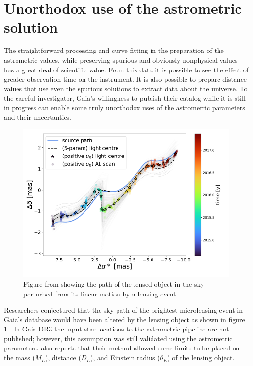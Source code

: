\documentclass[preprint2]{aastex631}
\begin{document}
\section{Unorthodox use of the astrometric solution} \label{sec:unorthodox}

The straightforward processing and curve fitting in the preparation of the astrometric values, while preserving spurious and obviously nonphysical values has a great deal of scientific value. From this data it is possible to see the effect of greater observation time on the instrument. It is also possible to prepare distance values that use even the spurious solutions to extract data about the universe. To the careful investigator, Gaia's willingness to publish their catalog while it is still in progress can enable some truly unorthodox uses of the astrometric parameters and their uncertanties.

\begin{figure}
	\includegraphics[width=\columnwidth]{microlensingpath.png}
	\caption{Figure from \cite{jablonskaThere2022} showing the path of the lensed object in the sky perturbed from its linear motion by a lensing event.}
	\label{fig:starpath}
\end{figure}

Researchers conjectured that the sky path of the brightest microlensing event in Gaia's database would have been altered by the lensing object as shown in figure \ref{fig:starpath} \citep{jablonskaThere2022} . In Gaia DR3 the input star locations to the astrometric pipeline are not published; however, this assumption was still validated using the astrometric parameters. \cite{jablonskaThere2022} also reports that their method allowed some limits to be placed on the mass ($M_L$), distance ($D_L$), and Einstein radius ($\theta_E$) of the lensing object. 
\end{document}
